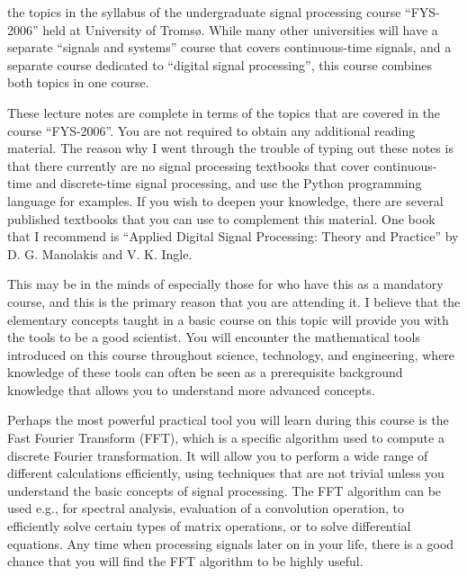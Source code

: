  the topics in the syllabus of the
undergraduate signal processing course ``FYS-2006'' held at University
of Troms\o{}. While many other universities will have a separate
``signals and systems'' course that covers continuous-time signals,
and a separate course dedicated to ``digital signal processing'', this
course combines both topics in one course.

These lecture notes are complete in terms of the topics that are
covered in the course ``FYS-2006''. You are not required to obtain any
additional reading material. The reason why I went through the trouble
of typing out these notes is that there currently are no signal
processing textbooks that cover continuous-time and discrete-time
signal processing, and use the Python programming language for
examples. If you wish to deepen your knowledge, there are several
published textbooks that you can use to complement this material. One
book that I recommend is ``Applied Digital Signal Processing: Theory
and Practice'' by D. G. Manolakis and V. K. Ingle.




 This may be in the minds of especially those for who have this as a mandatory course, and this is the primary reason that you are attending it. I believe that the elementary concepts taught in a basic course on this topic will provide you with the tools to be a good scientist. You will encounter the mathematical tools introduced on this course throughout science, technology, and engineering, where knowledge of these tools can often be seen as a prerequisite background knowledge that allows you to understand more advanced concepts.

Perhaps the most powerful practical tool you will learn during this course is the Fast Fourier Transform (FFT), which is a specific algorithm used to compute a discrete Fourier transformation. It will allow you to perform a wide range of different calculations efficiently, using techniques that are not trivial unless you understand the basic concepts of signal processing. The FFT algorithm can be used e.g., for spectral analysis, evaluation of a convolution operation, to efficiently solve certain types of matrix operations, or to solve differential equations. Any time when processing signals
later on in your life, there is a good chance that you will find the FFT algorithm to be highly useful.

